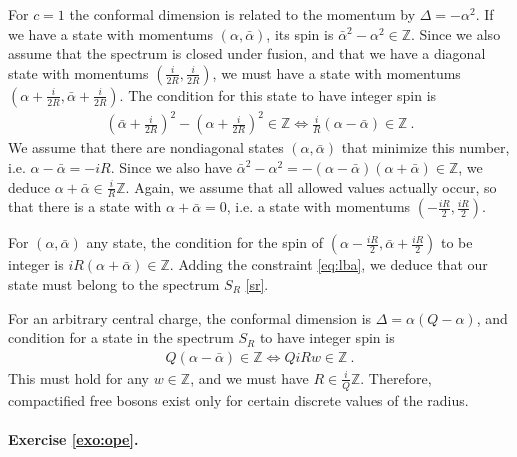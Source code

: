 \documentclass[12pt, a4paper]{article}
\theoremstyle{break}
\begin{document}
For $c=1$ the conformal dimension is related to the momentum by $\Delta = -\alpha^2$. If we have a state with momentums $(\alpha,\bar\alpha)$, its spin is $\bar\alpha^2-\alpha^2\in\mathbb{Z}$. Since we also assume that the spectrum is closed under fusion, and that we have a diagonal state with momentums $(\frac{i}{2R},\frac{i}{2R})$, we must have a state with momentums $(\alpha +\frac{i}{2R},\bar \alpha+\frac{i}{2R})$. The condition for this state to have integer spin is 
\begin{align}
 \left(\bar \alpha +\tfrac{i}{2R}\right)^2 - \left(\alpha +\tfrac{i}{2R}\right)^2 \in \mathbb{Z} \iff \frac{i}{R}(\alpha -\bar \alpha)\in\mathbb{Z}\ .
 \label{eq:lba}
\end{align}
We assume that there are nondiagonal states $(\alpha,\bar\alpha)$ that minimize this number, i.e. $\alpha-\bar\alpha = -iR$.
Since we also have $\bar\alpha^2-\alpha^2 = -(\alpha-\bar \alpha)(\alpha+\bar \alpha)\in\mathbb{Z}$, we deduce $\alpha+\bar\alpha\in \frac{i}{R}\mathbb{Z}$. Again, we assume that all allowed values actually occur, so that there is a state with $\alpha+\bar\alpha = 0$, i.e. a state with momentums $(-\frac{iR}{2},\frac{iR}{2})$.

For $(\alpha,\bar\alpha)$ any state, the condition for the spin of $(\alpha-\frac{iR}{2},\bar\alpha +\frac{iR}{2})$ to be integer is $iR(\alpha+\bar\alpha)\in\mathbb{Z}$. Adding the constraint \eqref{eq:lba}, we deduce that our state must belong to the spectrum $S_R$ \eqref{sr}.

For an arbitrary central charge, the conformal dimension is $\Delta = \alpha(Q-\alpha)$, and condition for  a state in the spectrum $S_R$ to have integer spin is 
\begin{align}
 Q(\alpha-\bar \alpha) \in\mathbb{Z} \iff QiRw \in\mathbb{Z}\ .
\end{align}
This must hold for any $w\in\mathbb{Z}$, and we must have $R\in \frac{i}{Q}\mathbb{Z}$. Therefore, compactified free bosons exist only for certain discrete values of the radius.


\paragraph{Exercise \ref{exo:ope}.}
\end{document}
